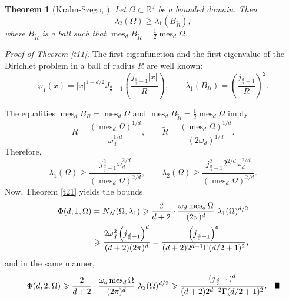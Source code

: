 \documentclass[a4paper,12pt]{article}
\numberwithin{equation}{section}
\def \la{\lambda}
\def \ph{\varphi}
\def \oo{\omega}
\def \G{\Gamma}
\def \O{\Omega}
\def \R{\mathbb{R}}
\def\mes{\operatorname{mes}}
\newcommand{\<}{\langle}
\renewcommand{\>}{\rangle}
\theoremstyle{plain}
\newtheorem{theorem}{\bf Theorem}[section]
\theoremstyle{definition}
\theoremstyle{remark}
\renewcommand{\ge}{\geqslant}
\renewcommand{\qed}{\vrule height7pt width5pt depth0pt}
\begin{document}
\begin{theorem}[Krahn-Szego, \cite{Kra}]
\label{t23}
Let $\O \subset \R^d$ be a bounded domain.
Then 
$$
\la_2 (\O) \ge \la_1 (B_{\tilde R}),
$$
where $B_{\tilde R}$ is a ball such that $\mes_d B_{\tilde R} = \frac12 \mes_d \O$.
\end{theorem}

{\it Proof of Theorem \ref{t11}.}
The first eigenfunction and the first eigenvalue 
of the Dirichlet problem in a ball of radius $R$ are well known:
\begin{equation}
\label{21}
\ph_1 (x) = |x|^{1-d/2} J_{\frac{d}2-1} \left(\frac{j_{\frac{d}2-1}|x|}R\right), 
\qquad
\la_1 (B_R) = \left(\frac{j_{\frac{d}2-1}}R\right)^2.
\end{equation}

The equalities $\mes_d B_R = \mes_d \O$ and $\mes_d B_{\tilde R} = \frac12 \mes_d \O$
imply
$$
R = \frac{(\mes_d \O)^{1/d}}{\oo_d^{1/d}}, \qquad
\tilde R = \frac{(\mes_d \O)^{1/d}}{(2 \oo_d)^{1/d}}.
$$
Therefore,
$$
\la_1 (\O) \ge \frac{j_{\frac{d}2-1}^2 \oo_d^{2/d}}{(\mes_d \O)^{2/d}},
\qquad 
\la_2 (\O) \ge \frac{j_{\frac{d}2-1}^2 2^{2/d} \oo_d^{2/d}}{(\mes_d \O)^{2/d}}.
$$
Now, Theorem \ref{t21} yields the bounds
\begin{eqnarray*}
\Phi (d, 1, \O) = N_{\cal N} (\O, \la_1) 
\ge \frac2{d+2} \cdot \frac{\oo_d \mes_d \O}{(2\pi)^d}\ \la_1 (\O)^{d/2} \\
\ge \frac{2 \oo_d^2 \left(j_{\frac{d}2-1}\right)^d}{(d+2) (2\pi)^d}
= \frac{\left(j_{\frac{d}2-1}\right)^d}{(d+2) 2^{d-1} \G(d/2+1)^2},
\end{eqnarray*}
and in the same manner,
\begin{eqnarray*}
\Phi (d, 2, \O) 
\ge \frac2{d+2} \cdot \frac{\oo_d \mes_d \O}{(2\pi)^d}\ \la_2 (\O)^{d/2}
\ge \frac{(j_{\frac{d}2-1})^d}{(d+2) 2^{d-2} \G(d/2+1)^2}.
\quad \qed
\end{eqnarray*}
\end{document}
